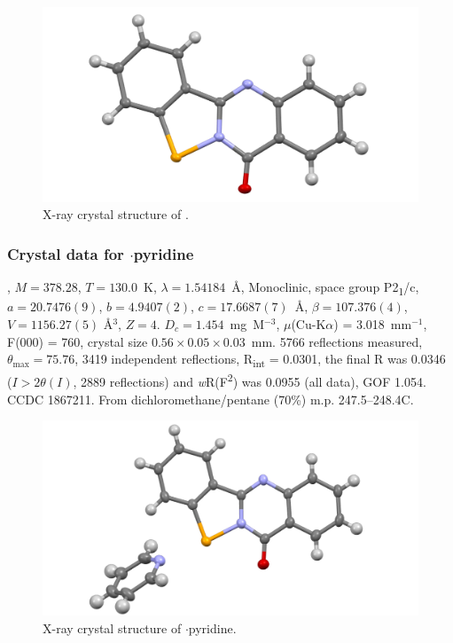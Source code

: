 \begin{refsection}
    \begin{figure}
      \includegraphics[width=0.6\linewidth]{Figures/tetracycle-xtal.pdf}
      \caption{X-ray crystal structure of \texorpdfstring{}{C14H8N2OSe}.}
    \end{figure}
    
    \subsubsection{Crystal data for \texorpdfstring{$ \cdot $pyridine}{C19H13N3OSe}}
    , $M=378.28$, $T=130.0$~K, $\lambda=1.54184$~\AA, Monoclinic, space group P2\textsubscript{1}/c, $a = 20.7476(9)$, $b = 4.9407(2)$, $c = 17.6687(7)$~\AA, $\beta = 107.376(4)$\degree, $V = 1156.27(5)$ \AA$^{3}$, $Z = 4$.
    $D_{c} = 1.454$~mg~M$^{-3}$, $\mu$(Cu-K$\alpha$) = 3.018~mm$^{-1}$, F(000) = 760, crystal size $0.56 \times 0.05 \times 0.03$~mm.
    5766 reflections measured, $\theta_{\max} = 75.76$\degree, 3419 independent reflections, R\textsubscript{int} = 0.0301, the final R was 0.0346 ($I > 2\theta(I)$, 2889 reflections) and \textit{w}R(F\textsuperscript{2}) was 0.0955 (all data), GOF 1.054.
    CCDC 1867211.
    From dichloromethane/pentane (70\%) m.p. 247.5--248.4\degree{}C.
    
    \begin{figure}
      \includegraphics[width=0.6\linewidth]{Figures/tetracycle-py-xtal.pdf}
      \caption{X-ray crystal structure of \texorpdfstring{$ \cdot $pyridine}{C19H13N3OSe}.}
    \end{figure}
    

\end{refsection}
